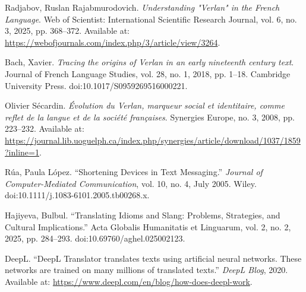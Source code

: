 \documentclass[12pt]{article}
\begin{document}



\begin{thebibliography}{9}

Radjabov, Ruslan Rajabmurodovich. \textit{Understanding "Verlan" in the French Language}. 
Web of Scientist: International Scientific Research Journal, vol. 6, no. 3, 2025, pp. 368–372. 
Available at: \url{https://webofjournals.com/index.php/3/article/view/3264}.

Bach, Xavier. \textit{Tracing the origins of Verlan in an early nineteenth century text}. 
Journal of French Language Studies, vol. 28, no. 1, 2018, pp. 1–18. 
Cambridge University Press. doi:10.1017/S0959269516000221.

Olivier Sécardin. \textit{Évolution du Verlan, marqueur social et identitaire, comme reflet de la langue et de la société françaises}. 
Synergies Europe, no. 3, 2008, pp. 223–232. 
Available at: \url{https://journal.lib.uoguelph.ca/index.php/synergies/article/download/1037/1859?inline=1}.

Rúa, Paula López. “Shortening Devices in Text Messaging.” 
\textit{Journal of Computer-Mediated Communication}, vol. 10, no. 4, July 2005. 
Wiley. doi:10.1111/j.1083-6101.2005.tb00268.x.

Hajiyeva, Bulbul. “Translating Idioms and Slang: Problems, Strategies, and Cultural Implications.”  
Acta Globalis Humanitatis et Linguarum, vol. 2, no. 2, 2025, pp. 284–293. doi:10.69760/aghel.025002123.  

DeepL. “DeepL Translator translates texts using artificial neural networks. These networks are trained on many millions of translated texts.” 
\textit{DeepL Blog}, 2020. Available at: \url{https://www.deepl.com/en/blog/how-does-deepl-work}.


\end{thebibliography}
\end{document}
